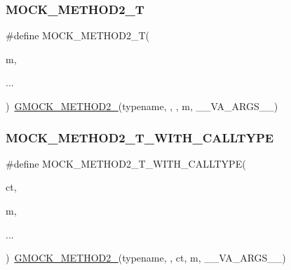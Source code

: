 \mbox{\label{googletest-master_2googlemock_2include_2gmock_2gmock-generated-function-mockers_8h_adb6e8d8bd6ab614c62d8ecc2ec163e3c}} 
\subsubsection{\texorpdfstring{MOCK\_METHOD2\_T}{MOCK\_METHOD2\_T}}
{\footnotesize\ttfamily \#define M\+O\+C\+K\+\_\+\+M\+E\+T\+H\+O\+D2\+\_\+T(\begin{DoxyParamCaption}\item[{}]{m,  }\item[{}]{... }\end{DoxyParamCaption})~\mbox{\hyperlink{_obj__test_2lib_2googletest-release-1_88_81_2googlemock_2include_2gmock_2gmock-generated-function-mockers_8h_a885295ca6bebb15efb3fc786218c5d47}{G\+M\+O\+C\+K\+\_\+\+M\+E\+T\+H\+O\+D2\+\_\+}}(typename, , , m, \+\_\+\+\_\+\+V\+A\+\_\+\+A\+R\+G\+S\+\_\+\+\_\+)}

\mbox{\label{googletest-master_2googlemock_2include_2gmock_2gmock-generated-function-mockers_8h_a18e4e8da0bdf27bde5ffca30587ff074}} 
\subsubsection{\texorpdfstring{MOCK\_METHOD2\_T\_WITH\_CALLTYPE}{MOCK\_METHOD2\_T\_WITH\_CALLTYPE}}
{\footnotesize\ttfamily \#define M\+O\+C\+K\+\_\+\+M\+E\+T\+H\+O\+D2\+\_\+\+T\+\_\+\+W\+I\+T\+H\+\_\+\+C\+A\+L\+L\+T\+Y\+PE(\begin{DoxyParamCaption}\item[{}]{ct,  }\item[{}]{m,  }\item[{}]{... }\end{DoxyParamCaption})~\mbox{\hyperlink{_obj__test_2lib_2googletest-release-1_88_81_2googlemock_2include_2gmock_2gmock-generated-function-mockers_8h_a885295ca6bebb15efb3fc786218c5d47}{G\+M\+O\+C\+K\+\_\+\+M\+E\+T\+H\+O\+D2\+\_\+}}(typename, , ct, m, \+\_\+\+\_\+\+V\+A\+\_\+\+A\+R\+G\+S\+\_\+\+\_\+)}

